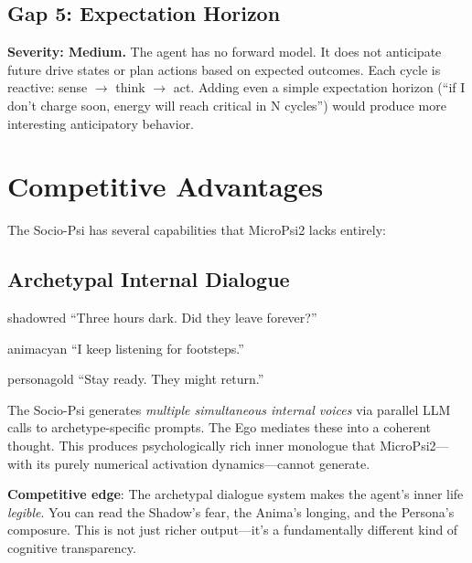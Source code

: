 \documentclass[11pt,letterpaper]{article}
\begin{document}
\subsection{Gap 5: Expectation Horizon}

\begin{gapbox}
\textbf{Severity: Medium.} The agent has no forward model. It does not
anticipate future drive states or plan actions based on expected outcomes.
Each cycle is reactive: sense $\rightarrow$ think $\rightarrow$ act. Adding
even a simple expectation horizon (``if I don't charge soon, energy will
reach critical in N cycles'') would produce more interesting anticipatory
behavior.
\end{gapbox}

\section{Competitive Advantages}
\label{sec:advantages}

The Socio-Psi has several capabilities that MicroPsi2 lacks entirely:

\subsection{Archetypal Internal Dialogue}

\begin{archetype}[Shadow]{shadowred}
  ``Three hours dark. Did they leave forever?''
\end{archetype}
\begin{archetype}[Anima]{animacyan}
  ``I keep listening for footsteps.''
\end{archetype}
\begin{archetype}[Persona]{personagold}
  ``Stay ready. They might return.''
\end{archetype}

The Socio-Psi generates \emph{multiple simultaneous internal voices} via
parallel LLM calls to archetype-specific prompts. The Ego mediates these
into a coherent thought. This produces psychologically rich inner monologue
that MicroPsi2---with its purely numerical activation dynamics---cannot
generate.

\textbf{Competitive edge}: The archetypal dialogue system makes the agent's
inner life \emph{legible}. You can read the Shadow's fear, the Anima's
longing, and the Persona's composure. This is not just richer output---it's
a fundamentally different kind of cognitive transparency.
\end{document}
